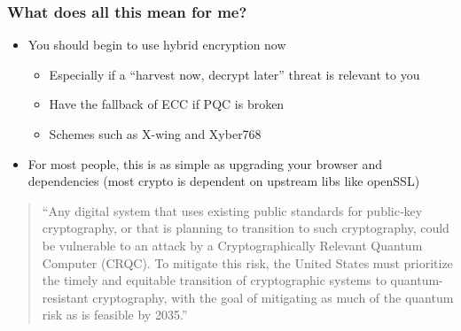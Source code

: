 \documentclass[
aspectratio=169, %
t, %
onlytextwidth, %
10pt, %
]{beamer}
\begin{document}
\begin{frame}
    \frametitle{What does all this mean for me?}
    \begin{adjustwidth}{0cm}{0.15\textwidth} %
        \begin{itemize}
            \item You should begin to use hybrid encryption now
            \begin{itemize}
                \item Especially if a ``harvest now, decrypt later'' threat is relevant to you
                \item Have the fallback of ECC if PQC is broken
                \item Schemes such as X-wing and Xyber768
            \end{itemize}
            \item For most people, this is as simple as upgrading your browser and dependencies (most crypto is dependent on upstream libs like openSSL)
        \end{itemize}
        \vspace{1.5em}
        \begin{quote}
            ``Any digital system that uses existing public standards for public‑key cryptography, or that is planning to transition to such cryptography, could be vulnerable to an attack by a Cryptographically Relevant Quantum Computer (CRQC). To mitigate this risk, the United States must prioritize the timely and equitable transition of cryptographic systems to quantum-resistant cryptography, with the goal of mitigating as much of the quantum risk as is feasible by 2035.''
        \end{quote}
    \end{adjustwidth}
\end{frame}

\end{document}
